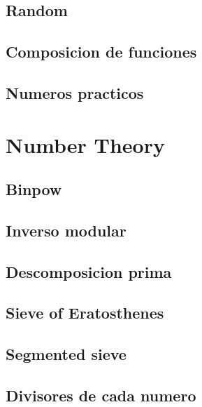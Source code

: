 \subsection{Random}
\raggedbottom
\hrulefill
\subsection{Composicion de funciones}
\raggedbottom
\hrulefill
\subsection{Numeros practicos}
\raggedbottom
\hrulefill

\section{Number Theory}
\subsection{Binpow}
\raggedbottom
\hrulefill
\subsection{Inverso modular}
\raggedbottom
\hrulefill
\subsection{Descomposicion prima}
\raggedbottom
\hrulefill
\subsection{Sieve of Eratosthenes}
\raggedbottom
\hrulefill
\subsection{Segmented sieve}
\raggedbottom
\hrulefill
\subsection{Divisores de cada numero}
\raggedbottom
\hrulefill
